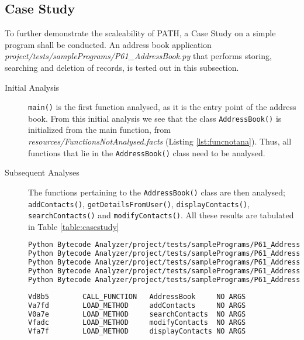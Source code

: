     
    \subsection{Case Study}
        \par To further demonstrate the scaleability of \acs{PATH}, a Case Study on a simple program shall be conducted. An address book application \textit{project/tests/samplePrograms/P61\_AddressBook.py} that performs storing, searching and deletion of records, is tested out in this subsection.

        \begin{description}
            \item[Initial Analysis] \lstinline|main()| is the first function analysed, as it is the entry point of the address book. From this initial analysis we see that the class \lstinline|AddressBook()| is initialized from the main function, from \textit{resources/FunctionsNotAnalysed.facts} (Listing \ref{lst:funcnotana}). Thus, all functions that lie in the \lstinline|AddressBook()| class need to be analysed.
            \item[Subsequent Analyses] The functions pertaining to the \lstinline|AddressBook()| class are then analysed; \lstinline|addContacts()|, \lstinline|getDetailsFromUser()|, \lstinline|displayContacts()|, \lstinline|searchContacts()| and \lstinline|modifyContacts()|. All these results are tabulated in Table \ref{table:casestudy}
            \small
            \begin{lstlisting}[float=h,language=bash,caption= \textit{resources/FunctionsNotAnalysed.facts},label=lst:funcnotana,numbers=none]
Python Bytecode Analyzer/project/tests/samplePrograms/P61_AddressBook.py	AddressBook.addContacts()
Python Bytecode Analyzer/project/tests/samplePrograms/P61_AddressBook.py	AddressBook.getDetailsFromUser()
Python Bytecode Analyzer/project/tests/samplePrograms/P61_AddressBook.py	AddressBook.displayContacts()
Python Bytecode Analyzer/project/tests/samplePrograms/P61_AddressBook.py	AddressBook.searchContacts()
Python Bytecode Analyzer/project/tests/samplePrograms/P61_AddressBook.py	AddressBook.modifyContacts()
            \end{lstlisting}

            \begin{lstlisting}[float,language=bash,caption= \textit{resources/SimpleIR.facts},label=lst:funcIR,numbers=none]
Vd8b5        CALL_FUNCTION   AddressBook     NO ARGS
Va7fd        LOAD_METHOD     addContacts     NO ARGS
V0a7e        LOAD_METHOD     searchContacts  NO ARGS
Vfadc        LOAD_METHOD     modifyContacts  NO ARGS
Vfa7f        LOAD_METHOD     displayContacts NO ARGS   


\end{lstlisting}
\end{description}
